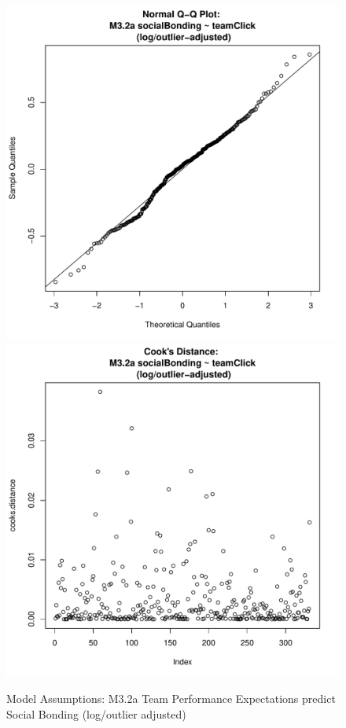 \documentclass[12pt]{report}
\begin{document}
{\begin{figure}[htbp]
  \includegraphics[scale =.4]{../images/MLM32aOutLogQQNorm.pdf}
  \includegraphics[scale =.4]{../images/MLM32aOutLogCooksD.pdf}
  \caption{Model Assumptions: M3.2a Team Performance Expectations predict Social Bonding (log/outlier adjusted)}
  \label{fig:MLM32aOutLogAssumptions}
\end{figure}






}
\end{document}
